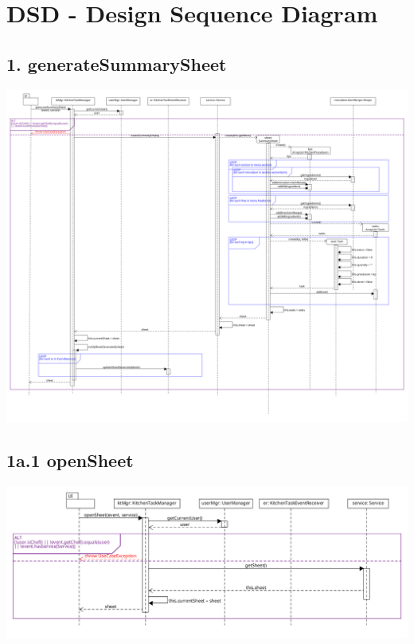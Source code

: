 \chapter{DSD - Design Sequence Diagram}

\section*{1. generateSummarySheet}

\begin{center}
  \includegraphics[scale = 0.22]{images/DSD/DSD 1.png}
\end{center}

\section*{1a.1 openSheet}

\begin{center}
  \includegraphics[scale = 0.35]{images/DSD/DSD 1a.png}
\end{center}

